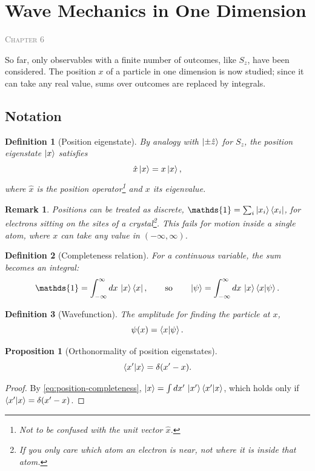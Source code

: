 \documentclass{article}
\newtheorem{definition}{Definition}
\newtheorem{remark}{Remark}
\newtheorem{proposition}{Proposition}
\newcommand{\id}{\mathds{1}}
\newcommand{\chapterstart}[1]{\noindent\hfill{\small\scshape\textcolor{gray}{Chapter #1}}\par}
\begin{document}
\section{Wave Mechanics in One Dimension}
\marginpar{}
\chapterstart{6}
So far, only observables with a finite number of outcomes, like $S_z$, have been considered. The position $x$ of a particle in one dimension is now studied; since it can take any real value, sums over outcomes are replaced by integrals.

\subsection{Notation}
\begin{definition}[Position eigenstate]
    By analogy with $\ket{\pm\hat{z}}$ for $S_z$, the position eigenstate $\ket{x}$ satisfies
    \begin{equation}
        \hat{x}\ket{x} = x\ket{x},
    \end{equation}
    where $\hat{x}$ is the position operator\footnote{Not to be confused with the unit vector $\hat{x}$.} and $x$ its eigenvalue.
\end{definition}
\begin{remark}
    Positions can be treated as discrete, $\id = \sum_i\ket{x_i}\bra{x_i}$, for electrons sitting on the sites of a crystal\footnote{If you only care which atom an electron is near, not where it is inside that atom.}. This fails for motion inside a single atom, where $x$ can take any value in $(-\infty, \infty)$.
\end{remark}
\begin{definition}[Completeness relation]
    For a continuous variable, the sum becomes an integral:
    \begin{equation}
        \label{eq:position-completeness}
        \id = \int_{-\infty}^{\infty} dx\,\ket{x}\bra{x}, \qquad \text{so} \qquad \ket{\psi} = \int_{-\infty}^{\infty} dx\,\ket{x}\braket{x|\psi}.
    \end{equation}
\end{definition}
\begin{definition}[Wavefunction]
    The amplitude for finding the particle at $x$,
    \begin{equation}
        \label{eq:wavefunction}
        \psi(x) = \braket{x|\psi}.
    \end{equation}
\end{definition}
\begin{proposition}[Orthonormality of position eigenstates]
    \begin{equation}
        \braket{x'|x} = \delta(x' - x).
    \end{equation}
\end{proposition}
\begin{proof}
    By \eqref{eq:position-completeness}, $\ket{x} = \int dx'\,\ket{x'}\braket{x'|x}$, which holds only if $\braket{x'|x} = \delta(x' - x)$.
\end{proof}
\end{document}
